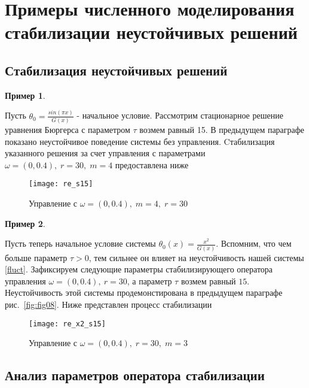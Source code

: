 \section{Примеры численного моделирования стабилизации неустойчивых решений}
\vspace{1em}

\subsection{Стабилизация неустойчивых решений}

\newtheorem{exmp_stbur}{Пример}

\begin{exmp_stbur}
\end{exmp_stbur}

Пусть $\theta_0 = \frac{sin(\pi x)}{G(x)}$ - начальное условие. Рассмотрим
стационарное решение уравнения Бюргерса с параметром $\tau$ возмем равный 15. 
В предыдущем параграфе показано неустойчивое поведение системы без управления. 
Cтабилизация указанного решения за счет управления с параметрами 
$\omega = (0, 0.4), \; r = 30, \; m = 4$ предоставлена ниже\\


\begin{figure}[H]
  \centering
  \texttt{[image: re\_s15]}
  \caption{Управление с $\omega = (0, 0.4), \; m = 4, \; r = 30$}
  \label{fig:fig09}
\end{figure}


\begin{exmp_stbur}
\end{exmp_stbur}
Пусть теперь начальное условие системы $\theta_0(x) = \frac{x^2}{G(x)}$.
Вспомним, что чем больше параметр $\tau > 0$, тем сильнее он влияет на
неустойчивость нашей системы \eqref{fluct}. Зафиксируем следующие параметры
стабилизирующего оператора управления $\omega = (0, 0.4), \ r = 30$, а параметр 
$\tau$  возмем равный $15$. Неустойчивость этой системы продемонстирована в
предыдущем параграфе рис.~\ref{fig:fig08}. Ниже представлен процесс стабилизации

\begin{figure}[H]
 \centering
  \texttt{[image: re\_x2\_s15]}
  \caption{Управление с $\omega = (0, 0.4), \; r = 30, \; m = 3$}
  \label{fig:fig10}
\end{figure}

\subsection{Анализ параметров оператора стабилизации}
\vspace{1em}

